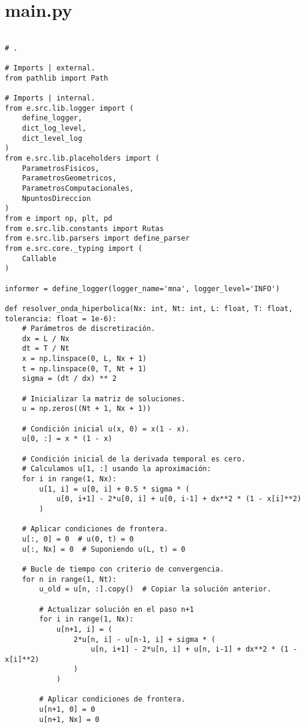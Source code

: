 \chapter{main.py}\label{apendice:a}

\begin{verbatim}

# .

# Imports | external.
from pathlib import Path

# Imports | internal.
from e.src.lib.logger import (
    define_logger,
    dict_log_level,
    dict_level_log
)
from e.src.lib.placeholders import (
    ParametrosFisicos,
    ParametrosGeometricos,
    ParametrosComputacionales,
    NpuntosDireccion
)
from e import np, plt, pd
from e.src.lib.constants import Rutas
from e.src.lib.parsers import define_parser
from e.src.core._typing import (
    Callable
)

informer = define_logger(logger_name='mna', logger_level='INFO')

def resolver_onda_hiperbolica(Nx: int, Nt: int, L: float, T: float, tolerancia: float = 1e-6):
    # Parámetros de discretización.
    dx = L / Nx
    dt = T / Nt
    x = np.linspace(0, L, Nx + 1)
    t = np.linspace(0, T, Nt + 1)
    sigma = (dt / dx) ** 2

    # Inicializar la matriz de soluciones.
    u = np.zeros((Nt + 1, Nx + 1))

    # Condición inicial u(x, 0) = x(1 - x).
    u[0, :] = x * (1 - x)

    # Condición inicial de la derivada temporal es cero.
    # Calculamos u[1, :] usando la aproximación:
    for i in range(1, Nx):
        u[1, i] = u[0, i] + 0.5 * sigma * (
            u[0, i+1] - 2*u[0, i] + u[0, i-1] + dx**2 * (1 - x[i]**2)
        )

    # Aplicar condiciones de frontera.
    u[:, 0] = 0  # u(0, t) = 0
    u[:, Nx] = 0  # Suponiendo u(L, t) = 0

    # Bucle de tiempo con criterio de convergencia.
    for n in range(1, Nt):
        u_old = u[n, :].copy()  # Copiar la solución anterior.

        # Actualizar solución en el paso n+1
        for i in range(1, Nx):
            u[n+1, i] = (
                2*u[n, i] - u[n-1, i] + sigma * (
                    u[n, i+1] - 2*u[n, i] + u[n, i-1] + dx**2 * (1 - x[i]**2)
                )
            )

        # Aplicar condiciones de frontera.
        u[n+1, 0] = 0
        u[n+1, Nx] = 0


\end{verbatim}
